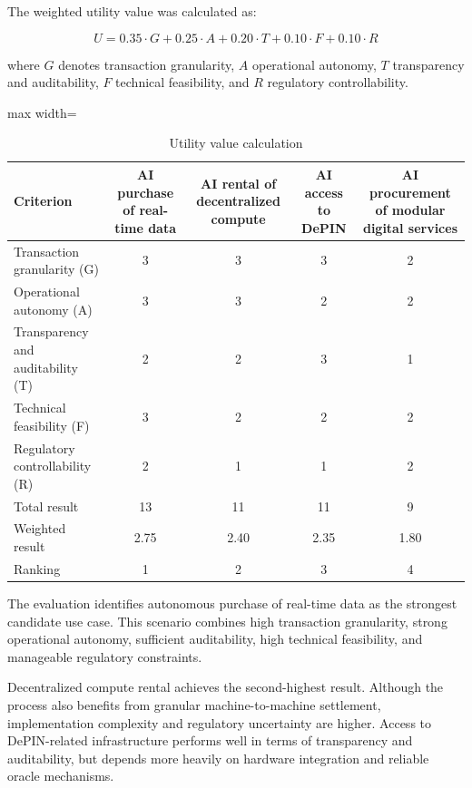 \documentclass[12pt,a4paper,oneside]{article}
\theoremstyle{definition}
\theoremstyle{plain}
\begin{document}
The weighted utility value was calculated as:

\[
U =
0.35 \cdot G +
0.25 \cdot A +
0.20 \cdot T +
0.10 \cdot F +
0.10 \cdot R
\]

where \(G\) denotes transaction granularity, \(A\) operational autonomy, \(T\) transparency and auditability, \(F\) technical feasibility, and \(R\) regulatory controllability.

\begin{table}[H]
\centering
\caption{Utility value calculation}
\label{tab:utility_value}

\begin{adjustbox}{max width=\textwidth}
\begin{tabular}{p{3.2cm}cccc}
\toprule

\textbf{Criterion}
&
\textbf{AI purchase of real-time data}
&
\textbf{AI rental of decentralized compute}
&
\textbf{AI access to DePIN}
&
\textbf{AI procurement of modular digital services}
\\

\midrule

Transaction granularity (G) & 3 & 3 & 3 & 2 \\
Operational autonomy (A) & 3 & 3 & 2 & 2 \\
Transparency and auditability (T) & 2 & 2 & 3 & 1 \\
Technical feasibility (F) & 3 & 2 & 2 & 2 \\
Regulatory controllability (R) & 2 & 1 & 1 & 2 \\

\midrule

Total result & 13 & 11 & 11 & 9 \\
Weighted result & 2.75 & 2.40 & 2.35 & 1.80 \\
Ranking & 1 & 2 & 3 & 4 \\

\bottomrule
\end{tabular}
\end{adjustbox}
\end{table}

The evaluation identifies autonomous purchase of real-time data as the strongest candidate use case. This scenario combines high transaction granularity, strong operational autonomy, sufficient auditability, high technical feasibility, and manageable regulatory constraints.

Decentralized compute rental achieves the second-highest result. Although the process also benefits from granular machine-to-machine settlement, implementation complexity and regulatory uncertainty are higher. Access to DePIN-related infrastructure performs well in terms of transparency and auditability, but depends more heavily on hardware integration and reliable oracle mechanisms.
\end{document}
